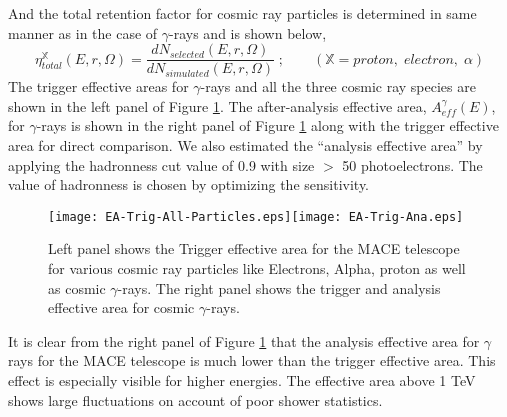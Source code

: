\documentclass[preprint,12pt]{elsarticle}
\begin{document}
%
And the total retention factor for cosmic ray particles is determined in same manner as in 
the case of $\gamma$-rays and is shown below,
%
\begin{equation}
	\eta_{total}^{\mathbb{X}}(E,r,\Omega) = \frac{dN_{selected} (E,r,\Omega)}{dN_{simulated} (E,r,\Omega)}\; ;
	\quad\quad ({\mathbb{X}} = proton,\; electron,\; \alpha)
\end{equation}
%
The trigger effective areas for $\gamma$-rays and all the three cosmic ray species are shown in 
the left panel of Figure \ref{Figure:EA}. The after-analysis effective area, $A_{eff}^\gamma(E)$,
for $\gamma$-rays is shown in the right panel of Figure \ref{Figure:EA} along with the trigger
effective area for direct comparison. We also estimated the ``analysis effective area'' by 
applying the hadronness cut value of 0.9 
with size $>$ 50 photoelectrons. The value of hadronness is chosen by optimizing the sensitivity.  
\begin{figure}[!h]
\begin{center}
\texttt{[image: EA-Trig-All-Particles.eps]}\texttt{[image: EA-Trig-Ana.eps]}
\caption{\label{Figure.}Left panel shows the Trigger effective area for the MACE telescope for various cosmic ray particles like Electrons, Alpha, proton as well as cosmic $\gamma$-rays. The right panel
shows the trigger and analysis effective area for cosmic $\gamma$-rays.}\label{Figure:EA}
\end{center}
\end{figure}
It is clear from the right panel of Figure \ref{Figure:EA} that the analysis effective area for $\gamma$ rays for the MACE telescope 
is much lower than the trigger effective area. This effect is especially visible 
for higher energies. The effective area above  1 TeV shows large fluctuations on account of poor shower statistics. 
\end{document}
